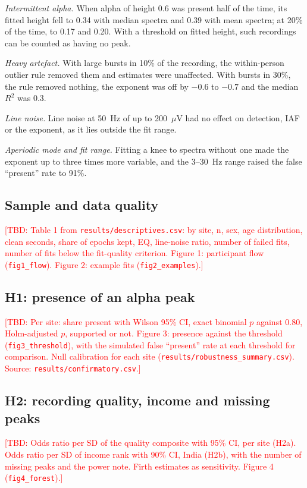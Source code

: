 \documentclass[11pt,a4paper]{article}
\newcommand{\TBD}[1]{\textcolor{red}{[TBD: #1]}}
\begin{document}
\emph{Intermittent alpha.} When alpha of height 0.6 was present half of the time, its
fitted height fell to 0.34 with median spectra and 0.39 with mean spectra; at 20\% of the
time, to 0.17 and 0.20. With a threshold on fitted height, such recordings can be counted
as having no peak.

\emph{Heavy artefact.} With large bursts in 10\% of the recording, the within-person
outlier rule removed them and estimates were unaffected. With bursts in 30\%, the rule
removed nothing, the exponent was off by $-0.6$ to $-0.7$ and the median $R^2$ was 0.3.

\emph{Line noise.} Line noise at 50~Hz of up to 200~$\mu$V had no effect on detection, IAF
or the exponent, as it lies outside the fit range.

\emph{Aperiodic mode and fit range.} Fitting a knee to spectra without one made the
exponent up to three times more variable, and the 3--30~Hz range raised the false
``present'' rate to 91\%.


\subsection{Sample and data quality}
\TBD{Table 1 from \texttt{results/descriptives.csv}: by site, n, sex, age distribution,
clean seconds, share of epochs kept, EQ, line-noise ratio, number of failed fits, number of
fits below the fit-quality criterion. Figure 1: participant flow (\texttt{fig1\_flow}).
Figure 2: example fits (\texttt{fig2\_examples}).}

\subsection{H1: presence of an alpha peak}
\TBD{Per site: share present with Wilson 95\% CI, exact binomial $p$ against 0.80,
Holm-adjusted $p$, supported or not. Figure 3: presence against the threshold
(\texttt{fig3\_threshold}), with the simulated false ``present'' rate at each threshold
for comparison. Null calibration for each site (\texttt{results/robustness\_summary.csv}).
Source: \texttt{results/confirmatory.csv}.}

\subsection{H2: recording quality, income and missing peaks}
\TBD{Odds ratio per SD of the quality composite with 95\% CI, per site (H2a). Odds ratio
per SD of income rank with 90\% CI, India (H2b), with the number of missing peaks and the
power note. Firth estimates as sensitivity. Figure 4 (\texttt{fig4\_forest}).}
\end{document}
